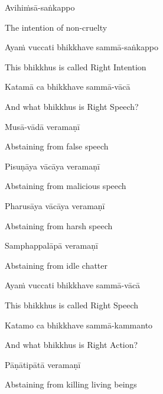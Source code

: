 Avihiṁsā-saṅkappo

\begin{cprenglish}
  The intention of non-cruelty
\end{cprenglish}

Ayaṁ vuccati bhikkhave sammā-saṅkappo

\begin{cprenglish}
  This bhikkhus is called Right Intention
\end{cprenglish}

Katamā ca bhikkhave sammā-vācā

\begin{cprenglish}
  And what bhikkhus is Right Speech?
\end{cprenglish}

Musā-vādā veramaṇī

\begin{cprenglish}
  Abstaining from false speech
\end{cprenglish}

Pisuṇāya vācāya veramaṇī

\begin{cprenglish}
  Abstaining from malicious speech
\end{cprenglish}

Pharusāya vācāya veramaṇī

\begin{cprenglish}
  Abstaining from harsh speech
\end{cprenglish}

Samphappalāpā veramaṇī

\begin{cprenglish}
  Abstaining from idle chatter
\end{cprenglish}

Ayaṁ vuccati bhikkhave sammā-vācā

\begin{cprenglish}
  This bhikkhus is called Right Speech
\end{cprenglish}

Katamo ca bhikkhave sammā-kammanto

\begin{cprenglish}
  And what bhikkhus is Right Action?
\end{cprenglish}

Pāṇātipātā veramaṇī

\begin{cprenglish}
  Abstaining from killing living beings
\end{cprenglish}

